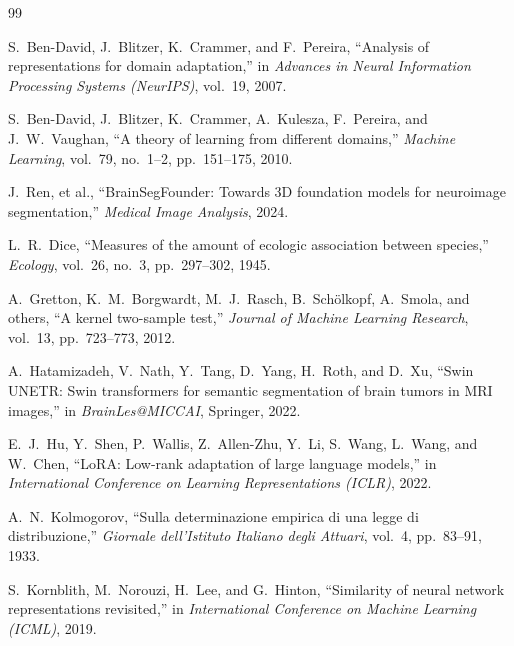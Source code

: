 \documentclass[11pt,a4paper]{article}
\theoremstyle{definition}
\begin{document}
\begingroup
\renewcommand{\section}[2]{}
\begin{thebibliography}{99}

S.~Ben-David, J.~Blitzer, K.~Crammer, and F.~Pereira,
``Analysis of representations for domain adaptation,''
in \emph{Advances in Neural Information Processing Systems (NeurIPS)}, vol.~19, 2007.

S.~Ben-David, J.~Blitzer, K.~Crammer, A.~Kulesza, F.~Pereira, and J.~W.~Vaughan,
``A theory of learning from different domains,''
\emph{Machine Learning}, vol.~79, no.~1--2, pp.~151--175, 2010.

J.~Ren, et al.,
``BrainSegFounder: Towards 3D foundation models for neuroimage segmentation,''
\emph{Medical Image Analysis}, 2024.

L.~R.~Dice,
``Measures of the amount of ecologic association between species,''
\emph{Ecology}, vol.~26, no.~3, pp.~297--302, 1945.

A.~Gretton, K.~M.~Borgwardt, M.~J.~Rasch, B.~Sch\"olkopf, A.~Smola, and others,
``A kernel two-sample test,''
\emph{Journal of Machine Learning Research}, vol.~13, pp.~723--773, 2012.

A.~Hatamizadeh, V.~Nath, Y.~Tang, D.~Yang, H.~Roth, and D.~Xu,
``Swin UNETR: Swin transformers for semantic segmentation of brain tumors in MRI images,''
in \emph{BrainLes@MICCAI}, Springer, 2022.

E.~J.~Hu, Y.~Shen, P.~Wallis, Z.~Allen-Zhu, Y.~Li, S.~Wang, L.~Wang, and W.~Chen,
``LoRA: Low-rank adaptation of large language models,''
in \emph{International Conference on Learning Representations (ICLR)}, 2022.

A.~N.~Kolmogorov,
``Sulla determinazione empirica di una legge di distribuzione,''
\emph{Giornale dell'Istituto Italiano degli Attuari}, vol.~4, pp.~83--91, 1933.

S.~Kornblith, M.~Norouzi, H.~Lee, and G.~Hinton,
``Similarity of neural network representations revisited,''
in \emph{International Conference on Machine Learning (ICML)}, 2019.


\end{thebibliography}
\end{document}
